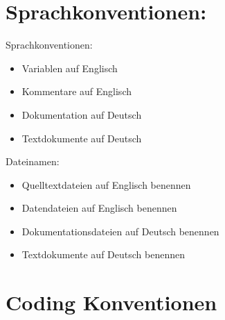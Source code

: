 \documentclass[11pt]{scrartcl}
\begin{document}
	\section{Sprachkonventionen:}
		Sprachkonventionen:
		\begin{itemize}
			\item Variablen auf Englisch
			\item Kommentare auf Englisch
			\item Dokumentation auf Deutsch
			\item Textdokumente auf Deutsch
		\end{itemize}
		Dateinamen:
		\begin{itemize}
			\item Quelltextdateien auf Englisch benennen
			\item Datendateien auf Englisch benennen
			\item Dokumentationsdateien auf Deutsch benennen
			\item Textdokumente auf Deutsch benennen
		\end{itemize}
	\section{Coding Konventionen}
\end{document}
